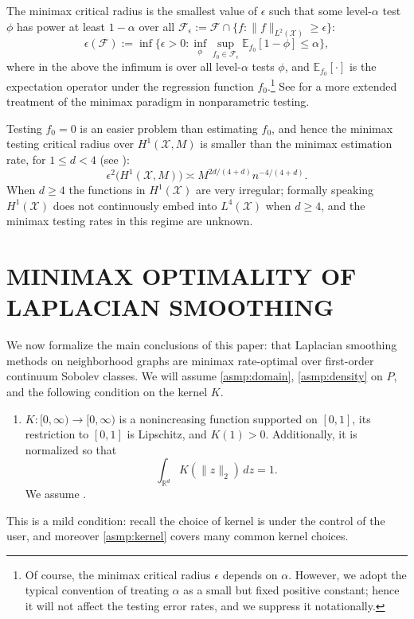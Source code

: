 \documentclass[twoside]{article}
\newcommand{\Reals}{\mathbb{R}}
\newcommand{\1}{\mathbf{1}}
\newcommand{\Rd}{\Reals^d}
\newcommand{\Xset}{\mathcal{X}}
\newcommand{\Leb}{L}
\newcommand{\mc}[1]{\mathcal{#1}}
\newcommand{\Ebb}{\mathbb{E}}
\theoremstyle{definition}
\theoremstyle{remark}
\begin{document}
The minimax critical radius is the smallest value of $\epsilon$ such that some level-${\alpha}$ test $\phi$ has power at least $1 - \alpha$ over all $\mc{F}_{\epsilon} := \mc{F} \cap \{f: \|f\|_{\Leb^2(\Xset)} \geq \epsilon\}$:
\begin{equation*}
\epsilon(\mc{F}) := \inf\biggl\{\epsilon > 0: \inf_{\phi} \sup_{f_0 \in \mc{F}_{\epsilon}} \Ebb_{f_0}[1 - \phi] \leq \alpha \biggr\},
\end{equation*} 
where in the above the infimum is over all level-$\alpha$ tests $\phi$, and $\Ebb_{f_0}[\cdot]$ is the expectation operator under the regression function $f_0$.\footnote{Of course, the minimax critical radius $\epsilon$ depends on $\alpha$. However, we adopt the typical convention of treating $\alpha$ as a small but fixed positive constant; hence it will not affect the testing error rates, and we suppress it notationally.} See \citet{ingster82,ingster87,ingster2012} for a more extended treatment of the minimax paradigm in nonparametric testing. 

Testing $f_0=0$ is an easier problem than estimating $f_0$, and hence the minimax testing critical radius over $H^1(\Xset,M)$ is smaller than the minimax estimation rate, for $1 \leq d < 4$ (see \citet{ingster2009}):
\begin{equation}
\label{eqn:sobolev_space_testing_critical_radius}
\epsilon^2\bigl(H^1(\Xset,M)\bigr) \asymp M^{2d/(4 + d)}n^{-4/(4 + d)}.
\end{equation}
When $d \geq 4$ the functions in $H^1(\Xset)$ are very irregular; formally speaking $H^1(\Xset)$ does not continuously embed into $\Leb^4(\Xset)$ when $d \geq 4$, and the minimax testing rates in this regime are unknown. 

\section{MINIMAX OPTIMALITY OF LAPLACIAN SMOOTHING}
\label{sec:minimax_optimal_laplacian_smoothing}

We now formalize the main conclusions of this paper: that Laplacian smoothing methods on neighborhood graphs are minimax rate-optimal over first-order continuum Sobolev classes. We will assume \ref{asmp:domain}, \ref{asmp:density} on $P$, and the following condition on the kernel $K$.
\begin{enumerate}[label=(K\arabic*)]
	\item
	\label{asmp:kernel}
	$K:[0,\infty) \to [0,\infty)$ is a nonincreasing function supported on $[0,1]$, its restriction to $[0,1]$ is Lipschitz, and $K(1) > 0$. Additionally, it is normalized so that
	\begin{equation*}
	\int_{\Rd} K(\|z\|_2) \,dz = 1.
	\end{equation*}
	We assume \smash{$\sigma_K = \frac{1}{d} \int_{\Rd} \|x\|_2^2 K(\|x\|_2) \,dx < \infty$}.
\end{enumerate}
This is a mild condition: recall the choice of kernel is under the control of the user, and moreover \ref{asmp:kernel} covers many common kernel choices.
\end{document}
